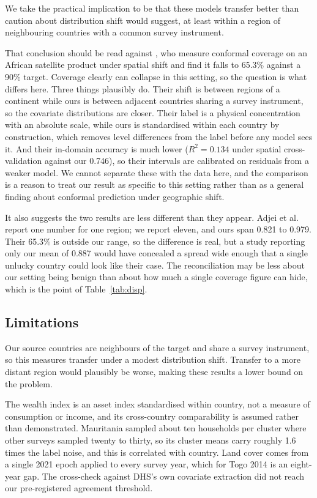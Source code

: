 \documentclass[11pt]{article}
\begin{document}
We take the practical implication to be that these models transfer better than
caution about distribution shift would suggest, at least within a region of
neighbouring countries with a common survey instrument.

That conclusion should be read against \citet{adjei2026}, who measure conformal
coverage on an African satellite product under spatial shift and find it falls
to 65.3\% against a 90\% target. Coverage clearly can collapse in this setting,
so the question is what differs here. Three things plausibly do. Their shift is
between regions of a continent while ours is between adjacent countries sharing
a survey instrument, so the covariate distributions are closer. Their label is
a physical concentration with an absolute scale, while ours is standardised
within each country by construction, which removes level differences from the
label before any model sees it. And their in-domain accuracy is much lower
($R^2 = 0.134$ under spatial cross-validation against our 0.746), so their
intervals are calibrated on residuals from a weaker model. We cannot separate
these with the data here, and the comparison is a reason to treat our result as
specific to this setting rather than as a general finding about conformal
prediction under geographic shift.

It also suggests the two results are less different than they appear. Adjei et
al. report one number for one region; we report eleven, and ours span 0.821 to
0.979. Their 65.3\% is outside our range, so the difference is real, but a study
reporting only our mean of 0.887 would have concealed a spread wide enough that
a single unlucky country could look like their case. The reconciliation may be
less about our setting being benign than about how much a single coverage figure
can hide, which is the point of Table~\ref{tab:disp}.

\subsection{Limitations}

Our source countries are neighbours of the target and share a survey
instrument, so this measures transfer under a modest distribution shift.
Transfer to a more distant region would plausibly be worse, making these results
a lower bound on the problem.

The wealth index is an asset index standardised within country, not a measure of
consumption or income, and its cross-country comparability is assumed rather
than demonstrated. Mauritania sampled about ten households per cluster where
other surveys sampled twenty to thirty, so its cluster means carry roughly 1.6
times the label noise, and this is correlated with country. Land cover comes
from a single 2021 epoch applied to every survey year, which for Togo 2014 is an
eight-year gap. The cross-check against DHS's own covariate extraction did not
reach our pre-registered agreement threshold.
\end{document}
